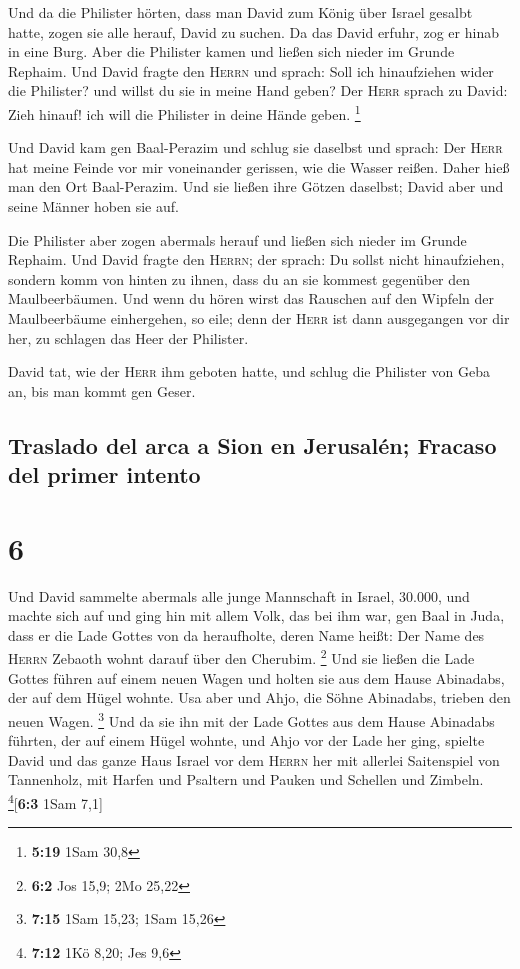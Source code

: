  Und da die Philister hörten, dass man David zum König
über Israel gesalbt hatte, zogen sie alle herauf, David zu suchen. Da
das David erfuhr, zog er hinab in eine Burg.  Aber die
Philister kamen und ließen sich nieder im Grunde Rephaim.
 Und David fragte den \textsc{Herrn} und sprach: Soll ich
hinaufziehen wider die Philister? und willst du sie in meine Hand geben?
Der \textsc{Herr} sprach zu David: Zieh hinauf! ich will die Philister
in deine Hände geben. \footnote{\textbf{5:19} 1Sam 30,8}

 Und David kam gen Baal-Perazim und schlug sie daselbst
und sprach: Der \textsc{Herr} hat meine Feinde vor mir voneinander
gerissen, wie die Wasser reißen. Daher hieß man den Ort Baal-Perazim.
 Und sie ließen ihre Götzen daselbst; David aber und
seine Männer hoben sie auf.

 Die Philister aber zogen abermals herauf und ließen sich
nieder im Grunde Rephaim.  Und David fragte den
\textsc{Herrn}; der sprach: Du sollst nicht hinaufziehen, sondern komm
von hinten zu ihnen, dass du an sie kommest gegenüber den
Maulbeerbäumen.  Und wenn du hören wirst das Rauschen auf
den Wipfeln der Maulbeerbäume einhergehen, so eile; denn der
\textsc{Herr} ist dann ausgegangen vor dir her, zu schlagen das Heer der
Philister.

 David tat, wie der \textsc{Herr} ihm geboten hatte, und
schlug die Philister von Geba an, bis man kommt gen Geser.

\hypertarget{traslado-del-arca-a-sion-en-jerusaluxe9n-fracaso-del-primer-intento}{%
\subsection{Traslado del arca a Sion en Jerusalén; Fracaso del primer
intento}\label{traslado-del-arca-a-sion-en-jerusaluxe9n-fracaso-del-primer-intento}}

\hypertarget{section-5}{%
\section{6}\label{section-5}}

 Und David sammelte abermals alle junge Mannschaft in
Israel, 30.000,  und machte sich auf und ging hin mit
allem Volk, das bei ihm war, gen Baal in Juda, dass er die Lade Gottes
von da heraufholte, deren Name heißt: Der Name des \textsc{Herrn}
Zebaoth wohnt darauf über den Cherubim. \footnote{\textbf{6:2} Jos 15,9;
  2Mo 25,22}  Und sie ließen die Lade Gottes führen auf
einem neuen Wagen und holten sie aus dem Hause Abinadabs, der auf dem
Hügel wohnte. Usa aber und Ahjo, die Söhne Abinadabs, trieben den neuen
Wagen. \footnote{\textbf{7:15} 1Sam 15,23; 1Sam 15,26} 
Und da sie ihn mit der Lade Gottes aus dem Hause Abinadabs führten, der
auf einem Hügel wohnte, und Ahjo vor der Lade her ging, 
spielte David und das ganze Haus Israel vor dem \textsc{Herrn} her mit
allerlei Saitenspiel von Tannenholz, mit Harfen und Psaltern und Pauken
und Schellen und Zimbeln. \footnote{\textbf{7:12} 1Kö 8,20; Jes 9,6}{[}\textbf{6:3}
1Sam 7,1{]}

